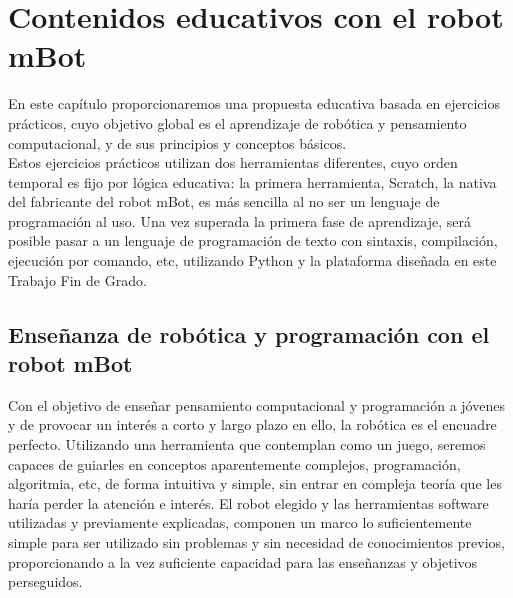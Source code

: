 \chapter{Contenidos educativos con el robot mBot}\label{cap:aplicationEducativa}
En este capítulo proporcionaremos una propuesta educativa  basada en ejercicios prácticos, cuyo objetivo global es el aprendizaje de robótica y pensamiento computacional, y de sus principios y conceptos básicos. \\
Estos ejercicios prácticos utilizan dos herramientas diferentes, cuyo orden temporal es fijo por lógica educativa: la primera herramienta, Scratch, la nativa del fabricante del robot mBot, es más sencilla al no ser un lenguaje de programación al uso. Una vez superada la primera fase de aprendizaje, será posible pasar a un lenguaje de programación de texto con sintaxis, compilación, ejecución por comando, etc, utilizando Python y la plataforma diseñada en este Trabajo Fin de Grado. 

\section{Enseñanza de robótica y programación con el robot mBot}\label{sec:enseñanzarobotica}
 Con el objetivo de enseñar pensamiento computacional y programación a jóvenes y de provocar un interés a corto y largo plazo en ello, la robótica es el encuadre perfecto. Utilizando una herramienta que contemplan como un juego, seremos capaces de guiarles en conceptos aparentemente complejos, programación, algoritmia, etc, de forma intuitiva y simple, sin entrar en compleja teoría que les haría perder la atención e interés. El robot elegido y las herramientas software utilizadas y previamente explicadas, componen un marco lo suficientemente simple para ser utilizado sin problemas y sin necesidad de conocimientos previos, proporcionando a la vez suficiente capacidad para las enseñanzas y objetivos perseguidos.
